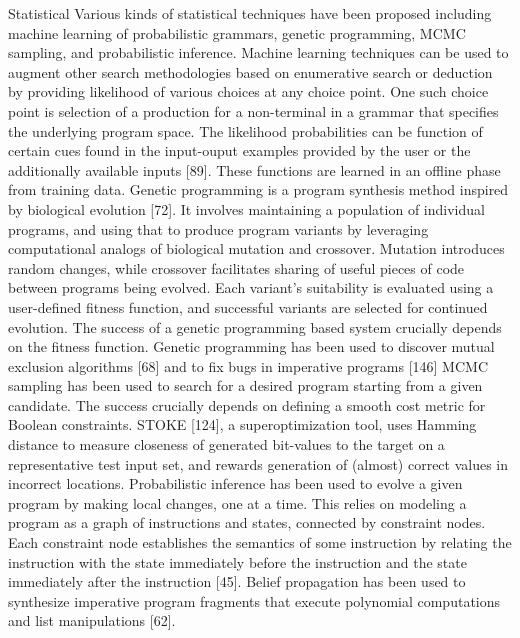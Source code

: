 Statistical Various kinds of statistical techniques have been proposed including machine learning of probabilistic grammars, genetic programming, MCMC sampling, and probabilistic inference. Machine learning techniques can be used to augment other search methodologies based on enumerative search or deduction by providing likelihood of various choices at any choice point. One such choice point is selection of a production for a non-terminal in a grammar that specifies the underlying program space. The likelihood probabilities can be function of certain cues found in the input-ouput examples provided by the user or the additionally available inputs [89]. These functions are learned in an offline phase from training data. Genetic programming is a program synthesis method inspired by biological evolution [72]. It involves maintaining a population of individual programs, and using that to produce program variants by leveraging computational analogs of biological mutation and crossover. Mutation introduces random changes, while crossover facilitates sharing of useful pieces of code between programs being evolved. Each variant's suitability is evaluated using a user-defined fitness function, and successful variants are selected for continued evolution. The success of a genetic programming based system crucially depends on the fitness function. Genetic programming has been used to discover mutual exclusion algorithms [68] and to fix bugs in imperative programs [146] MCMC sampling has been used to search for a desired program starting from a given candidate. The success crucially depends on defining a smooth cost metric for Boolean constraints. STOKE [124], a superoptimization tool, uses Hamming distance to measure closeness of generated bit-values to the target on a representative test input set, and rewards generation of (almost) correct values in incorrect locations. Probabilistic inference has been used to evolve a given program by making local changes, one at a time. This relies on modeling a program as a graph of instructions and states, connected by constraint nodes. Each constraint node establishes the semantics of some instruction by relating the instruction with the state immediately before the instruction and the state immediately after the instruction [45]. Belief propagation has been used to synthesize imperative program fragments that execute polynomial computations and list manipulations [62].

\cite{gulwani_program_2017}




